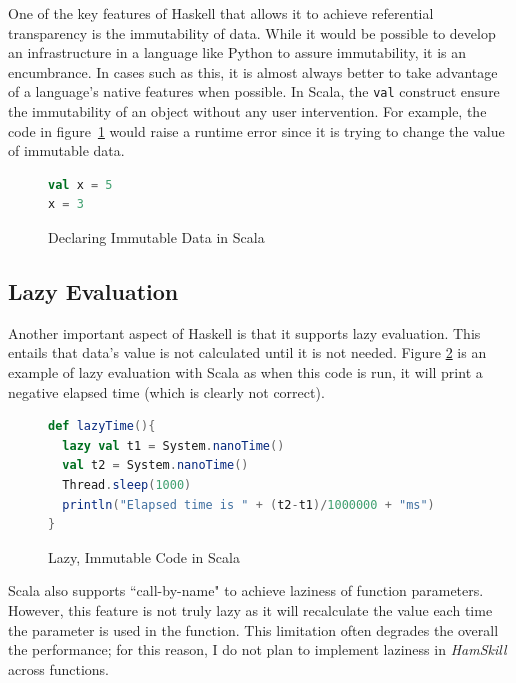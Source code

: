 \documentclass{report}
\begin{document}
One of the key features of Haskell that allows it to achieve referential transparency is the immutability of data.  While it would be possible to develop an infrastructure in a language like Python to assure immutability, it is an encumbrance.  In cases such as this, it is almost always better to take advantage of a language's native features when possible.  In Scala, the {\tt val} construct ensure the immutability of an object without any user intervention.  For example, the code in figure~\ref{fig:scalaValConstruct} would raise a runtime error since it is trying to change the value of immutable data.

\begin{figure}[H]
\begin{mdframed}
\begin{lstlisting}[language=Scala]
val x = 5
x = 3
\end{lstlisting}
\end{mdframed}
\caption{Declaring Immutable Data in Scala}\label{fig:scalaValConstruct}
\end{figure}

\subsection{Lazy Evaluation}\label{sec:lazyEvaluationScala}

Another important aspect of Haskell is that it supports lazy evaluation.  This entails that data's value is not calculated until it is not needed.  Figure \ref{fig:lazyImmutabilityInScala} is an example of lazy evaluation with Scala as when this code is run, it will print a negative elapsed time (which is clearly not correct).

\begin{figure}[H]
\begin{mdframed}
\begin{lstlisting}[language=Scala]
def lazyTime(){
  lazy val t1 = System.nanoTime()
  val t2 = System.nanoTime()
  Thread.sleep(1000)
  println("Elapsed time is " + (t2-t1)/1000000 + "ms")
}
\end{lstlisting}
\end{mdframed}
\caption{Lazy, Immutable Code in Scala}\label{fig:lazyImmutabilityInScala}
\end{figure}

Scala also supports ``call-by-name" to achieve laziness of function parameters.  However, this feature is not truly lazy as it will recalculate the value each time the parameter is used in the function.  This limitation often degrades the overall the performance; for this reason, I do not plan to implement laziness in \emph{HamSkill} across functions.
\end{document}
